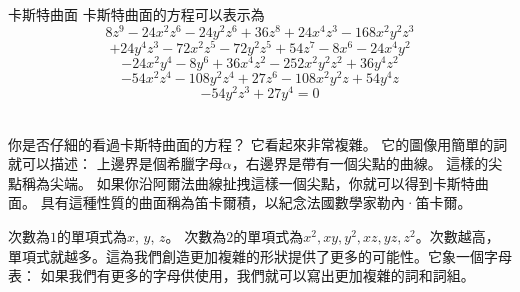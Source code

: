 \begin{surferPage}{卡斯特曲面}
卡斯特曲面的方程可以表示為 
  \smallskip
\[8z^9-24x^2z^6-24y^2z^6+36z^8+24x^4z^3-168x^2y^2z^3\]
\[+24y^4z^3-72x^2z^5-72y^2z^5+54z^7-8x^6-24x^4y^2\]
\[-24x^2y^4-8y^6 + 36x^4z^2-252x^2y^2z^2+36y^4z^2\]
\[- 54x^2z^4-108y^2z^4 + 27z^6-108x^2y^2z + 54y^4z\]
\[-54y^2z^3 + 27y^4 = 0\]\\
\vspace{0.3cm}

你是否仔細的看過卡斯特曲面的方程？ 它看起來非常複雜。 它的圖像用簡單的詞就可以描述： 上邊界是個希臘字母$\alpha$，右邊界是帶有一個尖點的曲線。 這樣的尖點稱為尖端。 如果你沿阿爾法曲線扯拽這樣一個尖點，你就可以得到卡斯特曲面。 具有這種性質的曲面稱為笛卡爾積，以紀念法國數學家勒內·笛卡爾。\\

\vspace{0.3cm}

次數為$1$的單項式為$x$, $y$, $z$。 次數為$2$的單項式為$x^2, xy, y^2, xz, yz, z^2$。次數越高，單項式就越多。這為我們創造更加複雜的形狀提供了更多的可能性。它象一個字母表： 如果我們有更多的字母供使用，我們就可以寫出更加複雜的詞和詞組。
\end{surferPage}
